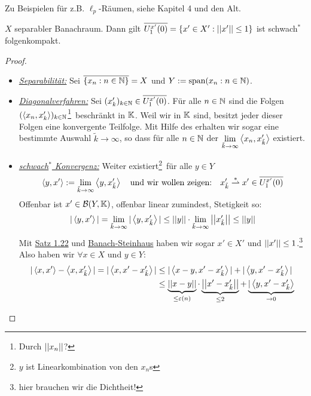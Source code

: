 Zu Beispielen für z.B. $\ell_p$-Räumen, siehe Kapitel 4 und den Alt.
	\begin{thm}
		\label{thm:3.32}
		$X$ separabler Banachraum. Dann gilt $\overline{U_1^{x'}(0)} = \{x' \in X' : \left\lvert \left\lvert x' \right\rvert \right\rvert \leq 1 \}$ ist schwach$^*$ folgenkompakt.	
	\end{thm}


	\begin{proof}
		\def\varI{\footnote{Durch $\norm{x_n}$?}\ }
		\def\varII{\footnote{$y$ ist Linearkombination von den $x_n$s}\ }
		\def\varIII{\footnote{hier brauchen wir die Dichtheit!} }
		\def\k{\tilde{k}}
		\begin{itemize}[]
			\item {\it \underline{Separabilität:}} Sei $\overline{\{x_n: n\in\mathbb{N}\}} = X$ und 
				$Y := \text{span}(x_n:n\in\mathbb{N})$.
			\item {\it \underline{Diagonalverfahren:}} 
				Sei $(x'_k)_{k\in\mathbb{N}} \in \overline{U_1^{x'}(0)}$.
				Für alle $n\in\mathbb{N}$ sind die Folgen $(\left \langle x_n,x_k' \right \rangle)_{k\in\mathbb{N}}$\varI  beschränkt 
				in $\mathbb{K}$. Weil wir in $\mathbb{K}$ sind, besitzt jeder dieser Folgen eine
				konvergente Teilfolge. Mit Hilfe des  
				erhalten wir sogar eine bestimmte Auswahl $\k\to \infty$, so dass
				für alle $n\in \mathbb{N}$ der $\disp \lim_{\k\to \infty}\fop{x_n,x_{\k}'}$ existiert.
				\item {\it \underline{schwach$^*$ Konvergenz:}}
				Weiter existiert\varII für alle $y\in Y$ 
					$$\fop{y,x'} := \lim_{\k\to \infty} \fop{y,x'_{\k}} \quad
						\text{und wir wollen zeigen:}\quad
						x'_{\k} \wskc x' \in \ov{U_1^{x'}(0)}	
					$$
				Offenbar ist $x'\in \mathcal{B}(Y,\mathbb{K})$, 
				{\small offenbar linear zumindest, Stetigkeit so:
				$$ |\fop{y,x'}| = \lim_{\k\to \infty} |\fop{y,x'_{\k}}| 
					\leq \norm{y} \cdot \lim_{\k\to \infty} 
						{\norm{x'_{\k}}} \leq \norm{y}$$}
				Mit \hyperref[thm:1.22]{Satz 1.22} und \hyperref[thm:2.18]{Banach-Steinhaus} haben wir sogar $x' \in X'$ und $\left\lvert \left\lvert x' \right\rvert \right\rvert \leq 1$.\varIII 
				Also haben wir $\forall x \in X$ und  $y\in Y$:
				\begin{align*}
					| \fop{x,x'} - \fop{x,x'_{\k}}|	= | \fop{x,x'- x'_{\k}} | 
						&\leq |\fop{x-y,x'- x'_{\k}} | + |\fop{y,x'- x'_{\k}} |\\
						&\leq 
							\underbrace{\norm{x-y}}_{\leq \varepsilon(n)}		\cdot 
							\underbrace{\norm{x'- x'_{\k}}}_{\leq 2} 				+ 
							\underbrace{|\fop{y,x'- x'_{\k}}}_{\to 0}	\\
						\end{align*}
		\end{itemize}
	\end{proof}

